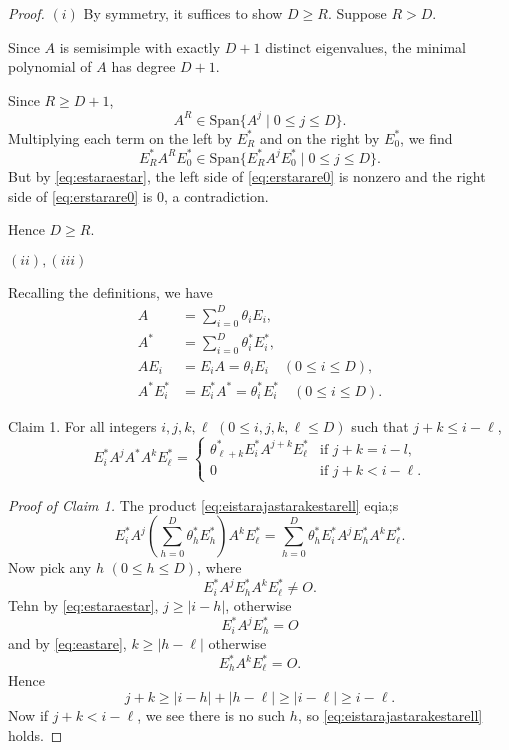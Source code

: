 \documentclass[
]{book}
\theoremstyle{definition}
\theoremstyle{definition}
\theoremstyle{definition}
\theoremstyle{definition}
\theoremstyle{remark}
\begin{document}
\begin{proof}
\leavevmode

\((i)\) By symmetry, it suffices to show \(D\geq R\). Suppose \(R > D\).

Since \(A\) is semisimple with exactly \(D+1\) distinct eigenvalues, the minimal polynomial of \(A\) has degree \(D+1\).

Since \(R \geq D+1\),
\[A^R \in \mathrm{Span}\{A^j\mid 0\leq j\leq D\}.\]
Multiplying each term on the left by \(E^*_R\) and on the right by \(E^*_0\), we find
\begin{equation}
E^*_RA^RE_0^* \in \mathrm{Span}\{E^*_RA^jE^*_0\mid 0\leq j\leq D\}. \label{eq:erstarare0}
\end{equation}
But by \eqref{eq:estaraestar}, the left side of \eqref{eq:erstarare0} is nonzero and the right side of \eqref{eq:erstarare0} is \(0\), a contradiction.

Hence \(D\geq R\).

\((ii), (iii)\)

Recalling the definitions, we have
\begin{align}
A & = \sum_{i=0}^D \theta_i E_i,\\
A^* & = \sum_{i=0}^D \theta_i^* E_i^*,\\
AE_i & = E_iA = \theta_iE_i \quad (0\leq i\leq D),\\
A^*E_i^* & = E_i^*A^* = \theta_i^*E_i^* \quad (0\leq i\leq D).
\end{align}

Claim 1. For all integers \(i,j,k,\ell\) \((0\leq i, j, k, \ell\leq D)\) such that \(j+k \leq i-\ell\),
\begin{equation}
E^*_iA^jA^*A^kE^*_\ell = \begin{cases} \theta^*_{\ell+k}E^*_iA^{j+k}E^*_\ell & \text{if } j+k = i-l,\\
0 & \text{if } j+k < i-\ell.\end{cases} \label{eq:eistarajastarakestarell}
\end{equation}

\emph{Proof of Claim 1.}
The product \eqref{eq:eistarajastarakestarell} eqia;s
\[E^*_iA^j\left(\sum_{h=0}^D \theta_h^* E_h^*\right)A^kE^*_\ell = \sum_{h=0}^D \theta^*_h E^*_iA^jE^*_hA^kE^*_\ell.\]
Now pick any \(h\) \((0\leq h\leq D)\), where
\[E^*_iA^jE^*_hA^kE^*_\ell \neq O.\]
Tehn by \eqref{eq:estaraestar}, \(j\geq |i-h|\), otherwise
\[E^*_iA^jE^*_h = O\]
and by \eqref{eq:eastare}, \(k\geq |h-\ell|\) otherwise
\[E^*_hA^kE^*_\ell = O.\]
Hence
\[j+k \geq |i-h|+|h-\ell| \geq |i-\ell| \geq i-\ell.\]
Now if \(j+k < i-\ell\), we see there is no such \(h\), so \eqref{eq:eistarajastarakestarell} holds.


\end{proof}
\end{document}
